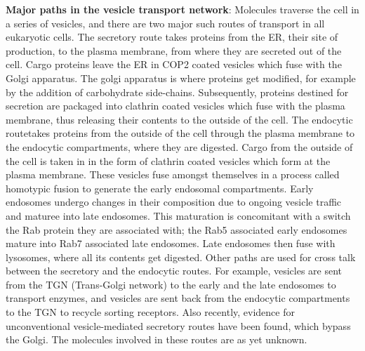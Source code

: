 \textbf{Major paths in the vesicle transport network}:
Molecules traverse the cell in a series of vesicles, and there are two major such routes of transport in all eukaryotic cells.
%
	The secretory route takes proteins from the ER, their site of production, to the plasma membrane, from where they are secreted out of the cell.
	 Cargo proteins leave the ER in COP2 coated vesicles which fuse with the Golgi apparatus.
	  The golgi apparatus is where proteins get modified, for example by the addition of carbohydrate side-chains. 
	  Subsequently, proteins destined for secretion are packaged into clathrin coated vesicles which fuse with the plasma membrane, thus releasing their contents to the outside of the cell\cite{alberts2002molecular}.
 The endocytic routetakes proteins from the outside of the cell through the plasma membrane to the endocytic compartments, where they are digested. 
 Cargo from the outside of the cell is taken in in the form of clathrin coated vesicles which form at the plasma membrane. 
 These vesicles fuse amongst themselves in a process called homotypic fusion to generate the early endosomal compartments. 
 Early endosomes undergo changes in their composition due to ongoing vesicle traffic and maturee into late endosomes. 
 This maturation is concomitant with a switch the Rab protein they are associated with; the Rab5 associated early endosomes mature into Rab7 associated late endosomes\cite{rink2005rab}. Late endosomes then fuse with lysosomes, where all its contents get digested\cite{pryor2009delivery}.
%
Other paths are used for cross talk between the secretory and the endocytic routes. For example, vesicles are sent from the TGN (Trans-Golgi network) to the early and the late endosomes to transport enzymes, and vesicles are sent back from the endocytic compartments to the TGN to recycle sorting receptors\cite{progida2016bidirectional}. Also recently, evidence for unconventional vesicle-mediated secretory routes have been found, which bypass the Golgi. The molecules involved in these routes are as yet unknown\cite{nickel2018unconventional}. 
%

